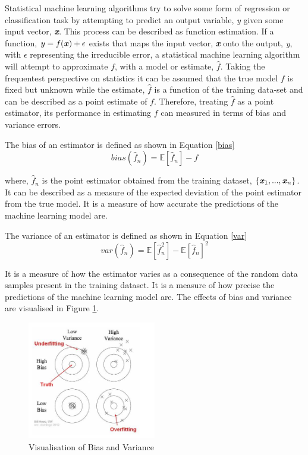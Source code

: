 \documentclass[../SMLreport_template.tex]{subfiles}
\begin{document}
Statistical machine learning algorithms try to solve some form of regression or classification task by attempting to predict an output variable, \textit{y} given some input vector, \textbf{\textit{x}}. This process can be described as function estimation. If a function, \(y = f(\textbf{\textit{x}}) + \epsilon\) exists that maps the input vector, \textbf{\textit{x}} onto the output, \textit{y}, with \(\epsilon\) representing the irreducible error, a statistical machine learning algorithm will attempt to approximate \(f\), with a model or estimate, \(\hat{f}\). Taking the frequentest perspective on statistics it can be assumed that the true model \(f\) is fixed but unknown while the estimate, \(\hat{f}\) is a function of the training data-set and can be described as a point estimate of \(f\). Therefore, treating \(\hat{f}\) as a point estimator, its performance in estimating \(f\) can measured in terms of bias and variance errors. \par
\noindent 

The bias of an estimator is defined as shown in Equation \ref{bias}
\begin{equation} \label{bias}
bias(\hat{f}_n) =
\mathbb{E}[\hat{f}_n] - f
\end{equation}

where, \(\hat{f}_n\) is the point estimator obtained from the training dataset, \(\{\textbf{\textit{x}}_1, ... , \textbf{\textit{x}}_n\}\). It can be described as a measure of the expected deviation of the point estimator from the true model. It is a measure of how accurate the predictions of the machine learning model are. 

The variance of an estimator is defined as shown in Equation \ref{var} 
\begin{equation} \label{var}
var(\hat{f}_n) = \mathbb{E}[\hat{f}_n^2] - \mathbb{E}[\hat{f}_n]^2 
\end{equation}

It is a measure of how the estimator varies as a consequence of the random data samples present in the training dataset. It is a measure of how precise the predictions of the machine learning model are. The effects of bias and variance are visualised in Figure \ref{acc}. \par \noindent

\begin{figure}[t]
    \centering
    \includegraphics[width=0.5\textwidth]{sections/images/accuracy.png}
    \caption{Visualisation of Bias and Variance}
    \label{acc}
\end{figure}
\end{document}
